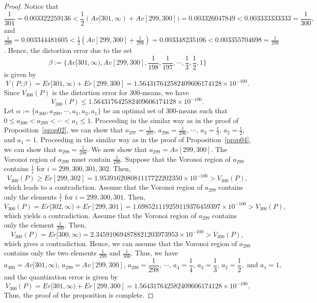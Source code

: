 \documentclass[12pt, reqno]{amsart}
\theoremstyle{plain}
\theoremstyle{definition}
\newcommand{\set}[1]{\{#1\}}%
\newcommand{\ga}{\alpha}
\newcommand{\gb}{\beta}
\newcommand{\te}{\text}%
\begin{document}
\begin{proof}
Notice that \[\frac 1 {301}=0.003322259136<\frac 12(Av[301, \infty)+ Av[299, 300])=0.003326047849<0.003333333333=\frac 1{300},\] and $\frac{1}{299}=0.003344481605<\frac{1}{2} (Av[299, 300]+\frac{1}{298})=0.003348235106<0.003355704698=\frac{1}{298}$. Hence, the distortion error due to the set
\[\gb:=\set{Av[301, \infty), Av[299, 300], \frac 1 {198}, \frac 1{197},  \cdots, \frac 13, \frac 12, 1}\] is given by
\[V(P; \gb)=Er[301, \infty)+Er[299, 300]=1.564317642582409606174128\times 10^{-100}.\]
Since $V_{300}(P)$ is the distortion error for $300$-means, we have \[V_{300}(P)\leq 1.564317642582409606174128\times 10^{-100}.\] Let $\ga:=\set{a_{300}, a_{299}, \cdots, a_3, a_2, a_1}$ be an optimal set of $300$-means such that $0\leq a_{300}<a_{299}<\cdots<a_1\leq 1$. Proceeding in the similar way as in the proof of Proposition~\ref{prop02}, we can show that $a_{297}=\frac 1{297}, \, a_{296}=\frac 1{296}, \, \cdots, \, a_3=\frac 13, \, a_2=\frac 12$, and $a_1=1$. Proceeding in the similar way as in the proof of Proposition~\ref{prop04}, we can show that $a_{298}=\frac 1{298}$.
We now show that $a_{299}=Av[299, 300]$. The Voronoi region of $a_{299}$ must contain $\frac 1 {299}$.
Suppose that the Voronoi region of $a_{299}$ contains $\frac 1 i$ for $i=299, 300, 301, 302$. Then,
\[V_{300}(P)\geq Er[299, 302]=1.953916208081117722202350\times 10^{-100}>V_{300}(P),\]
which leads to a contradiction. Assume that the Voronoi region of $a_{299}$ contains only the elements $\frac 1 i$ for $i=299, 300, 301$. Then,
\[V_{300}(P)= Er[302, \infty)+Er[299, 301]=1.698521119259119376459397\times 10^{-100}>V_{300}(P),\]
which yields a contradiction. Assume that the Voronoi region of $a_{299}$ contains only the element $\frac 1{299}$. Then,
\[V_{300}(P)=Er[300, \infty)=2.345910694878821203973953\times 10^{-100}>V_{300}(P),\]
which gives a contradiction.
Hence, we can assume that the Voronoi region of $a_{299}$ contains only the two elements $\frac 1{299}$ and $\frac 1{300}$.
Thus, we have
\[a_{300}=Av[301, \infty), \, a_{299}= Av[299, 300], \, a_{298}=\frac 1 {298}, \,  \cdots, \,  a_4=\frac 14, \, a_3=\frac 13, \, a_2=\frac 12, \te{ and } a_1=1,\]
and the quantization error is given by
\[V_{300}(P)=Er[301, \infty)+Er[299, 300]=1.564317642582409606174128\times 10^{-100}.\] Thus, the proof of the proposition is complete.
\end{proof} 
\end{document}
